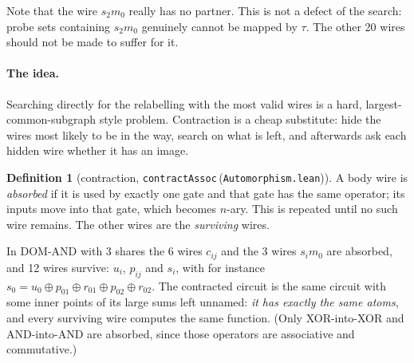 \documentclass[11pt,a4paper]{article}
\theoremstyle{definition}
\newtheorem{definition}[theorem]{Definition}
\theoremstyle{remark}
\newcommand{\code}[1]{\texttt{\small #1}}
\newcommand{\lean}[2]{\code{#1}\,(\code{#2})}
\begin{document}
Note that the wire $s_2m_0$ really has no partner.  This is not a defect of the search: probe
sets containing $s_2m_0$ genuinely cannot be mapped by $\tau$.  The other 20 wires should not be
made to suffer for it.

\paragraph{The idea.}  Searching directly for the relabelling with the most valid wires is a
hard, largest-common-subgraph style problem.  Contraction is a cheap substitute: hide the wires
most likely to be in the way, search on what is left, and afterwards ask each hidden wire
whether it has an image.

\begin{definition}[contraction, \lean{contractAssoc}{Automorphism.lean}]
A body wire is \emph{absorbed} if it is used by exactly one gate and that gate has the same
operator; its inputs move into that gate, which becomes $n$-ary.  This is repeated until no such
wire remains.  The other wires are the \emph{surviving} wires.
\end{definition}

In DOM-AND with 3 shares the 6 wires $c_{ij}$ and the 3 wires $s_im_0$ are absorbed, and 12
wires survive: $u_i$, $p_{ij}$ and $s_i$, with for instance
$s_0 = u_0\oplus p_{01}\oplus r_{01}\oplus p_{02}\oplus r_{02}$.  The contracted circuit is the
same circuit with some inner points of its large sums left unnamed: \emph{it has exactly the
same atoms}, and every surviving wire computes the same function.  (Only XOR-into-XOR and
AND-into-AND are absorbed, since those operators are associative and commutative.)
\end{document}
